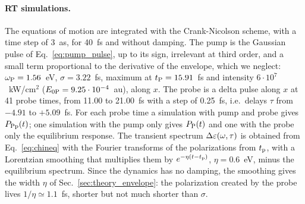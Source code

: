 \documentclass[aps,prb,reprint,superscriptaddress,amsmath,amssymb]{revtex4-2}
\begin{document}
\paragraph*{RT simulations.} The equations of motion are integrated with the Crank-Nicolson scheme, with a time step
of 3~as, for 40~fs and without damping. The pump is the Gaussian pulse of Eq.~\eqref{eq:pump_pulse}, up to its sign,
irrelevant at third order, and a small term proportional to the derivative of the envelope, which we neglect:
$\omega_{\mathrm{P}} = 1.56$~eV, $\sigma = 3.22$~fs, maximum at $t_{\mathrm{P}} = 15.91$~fs and intensity $6\cdot10^7$~kW/cm$^2$
($E_{0\mathrm{P}} = 9.25\cdot10^{-4}$~au), along $x$. The probe is a delta pulse along $x$ at 41 probe times, from 11.00 to
21.00~fs with a step of 0.25~fs, i.e.\ delays $\tau$ from $-4.91$ to $+5.09$~fs. For each probe time a simulation with
pump and probe gives $P_{\mathrm{Pp}}(t)$; one simulation with the pump only gives $P_{\mathrm{P}}(t)$ and one with the probe only the
equilibrium response. The transient spectrum $\Delta\varepsilon(\omega,\tau)$ is obtained from Eq.~\eqref{eq:chineq} with the
Fourier transforms of the polarizations from $t_{\mathrm{p}}$, with a Lorentzian smoothing that multiplies them by
$e^{-\eta(t-t_{\mathrm{p}})}$, $\eta = 0.6$~eV, minus the equilibrium spectrum. Since the dynamics has no damping, the smoothing
gives the width $\eta$ of Sec.~\ref{sec:theory_envelope}: the polarization created by the probe lives
$1/\eta\simeq1.1$~fs, shorter but not much shorter than $\sigma$.
\end{document}
